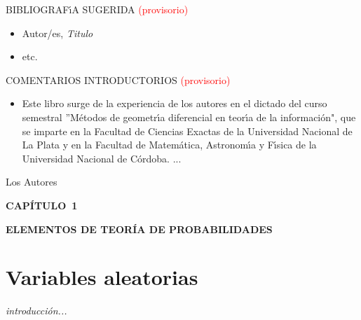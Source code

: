 \documentclass[10pt]{article}
\begin{document}
\vskip1cm

BIBLIOGRAF\'{\i}A SUGERIDA \textcolor{red}{(provisorio)} %

\begin{itemize}
\item Autor/es, \textit{Titulo} 
\item etc.
\end{itemize}

\thispagestyle{empty}

\newpage

\thispagestyle{empty}

COMENTARIOS INTRODUCTORIOS \textcolor{red}{(provisorio)} %

\begin{itemize}
\item[]
Este libro surge de la experiencia de los autores en el dictado del curso semestral ''M\'etodos de geometr\'{\i}a diferencial en teor\'{\i}a de la informaci\'on", que se imparte en la Facultad de Ciencias Exactas de la Universidad Nacional de La Plata y en la Facultad de Matem\'atica, Astronom\'{\i}a y F\'{\i}sica de la Universidad Nacional de C\'ordoba. 
...

\end{itemize}

\hspace{8cm} Los Autores

\newpage

\setcounter{page}{1}

{\LARGE
\noindent \textbf{CAP\'ITULO~1}

\noindent \textbf{ELEMENTOS DE TEOR\'IA DE PROBABILIDADES}
} 


\vspace{1.5pt}
\section{Variables aleatorias}
\label{s:var_aleat}

\emph{introducci\'on...}

\vspace{1.5pt}
\end{document}
